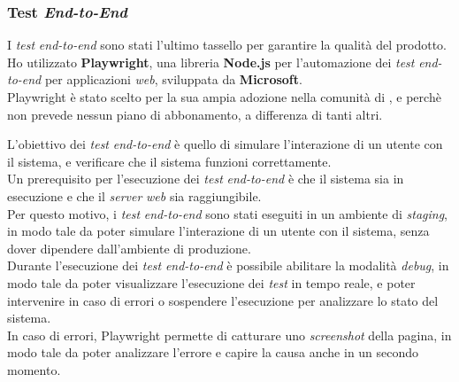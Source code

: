 \subsubsection*{Test \textit{End-to-End}}
I \textit{test} \textit{end-to-end} sono stati l'ultimo tassello per garantire la qualità del prodotto.
Ho utilizzato \textbf{Playwright}, una libreria \textbf{Node.js} per l'automazione dei \textit{test} \textit{end-to-end}
 per applicazioni \textit{web}, sviluppata da \textbf{Microsoft}.\\
Playwright è stato scelto per la sua ampia adozione nella comunità di \azienda{},
e perchè non prevede nessun piano di abbonamento, a differenza di tanti altri.

L'obiettivo dei \textit{test} \textit{end-to-end} è quello di simulare l'interazione di 
un utente con il sistema, e verificare che il sistema funzioni correttamente.\\
Un prerequisito per l'esecuzione dei \textit{test} \textit{end-to-end} è che il sistema sia in esecuzione
e che il \textit{server} \textit{web} sia raggiungibile.\\
Per questo motivo, i \textit{test} \textit{end-to-end} sono stati eseguiti in un ambiente di \textit{staging},
in modo tale da poter simulare l'interazione di un utente con il sistema, senza dover dipendere
dall'ambiente di produzione.\\

Durante l'esecuzione dei \textit{test} \textit{end-to-end} è possibile abilitare la modalità \textit{debug},
in modo tale da poter visualizzare l'esecuzione dei \textit{test} in tempo reale, e poter intervenire
in caso di errori o sospendere l'esecuzione per analizzare lo stato del sistema.\\

In caso di errori, Playwright permette di catturare uno \textit{screenshot} della pagina,
in modo tale da poter analizzare l'errore e capire la causa anche in un secondo momento.\\
